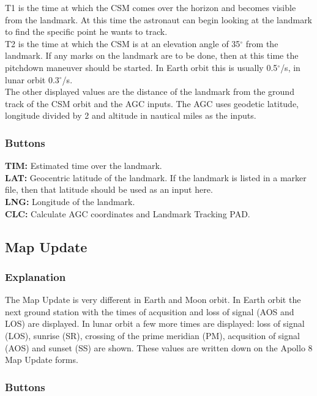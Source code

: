 \documentclass[11pt]{article} %
\begin{document}
T1 is the time at which the CSM comes over the horizon and becomes visible from the landmark. At this time the astronaut can begin looking at the landmark to find the specific point he wants to track. \\
T2 is the time at which the CSM is at an elevation angle of 35$^{\circ}$ from the landmark. If any marks on the landmark are to be done, then at this time the pitchdown maneuver should be started. In Earth orbit this is usually 0.5$^{\circ}$/s, in lunar orbit 0.3$^{\circ}$/s. \\
The other displayed values are the distance of the landmark from the ground track of the CSM orbit and the AGC inputs. The AGC uses geodetic latitude, longitude divided by 2 and altitude in nautical miles as the inputs.\\

\subsubsection{Buttons}

\textbf{TIM:} Estimated time over the landmark.\\
\textbf{LAT:} Geocentric latitude of the landmark.  If the landmark is listed in a marker file, then that latitude should be used as an input here.\\
\textbf{LNG:} Longitude of the landmark.\\
\textbf{CLC:} Calculate AGC coordinates and Landmark Tracking PAD.\\
\newpage
\subsection{Map Update}

\subsubsection{Explanation}

The Map Update is very different in Earth and Moon orbit. In Earth orbit the next ground station with the times of acqusition and loss of signal (AOS and LOS) are displayed.  In lunar orbit a few more times are displayed: loss of signal (LOS), sunrise (SR), crossing of the prime meridian (PM), acqusition of signal (AOS) and sunset (SS) are shown. These values are written down on the Apollo 8 Map Update forms.\\ 

\subsubsection{Buttons}
\end{document}
